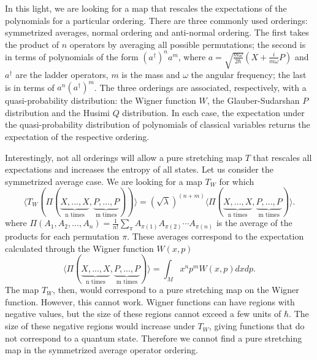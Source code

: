 \documentclass{article}
\begin{document}
In this light, we are looking for a map that rescales the expectations of the polynomials for a particular ordering. There are three commonly used orderings: symmetrized averages, normal ordering and anti-normal ordering. The first takes the product of $n$ operators by averaging all possible permutations; the second is in terms of polynomials of the form $(a^\dagger)^n a^m$, where $a=\sqrt{\frac{m\omega}{2\hbar}}(X+\frac{i}{m\omega}P)$ and $a^\dagger$ are the ladder operators, $m$ is the mass and $\omega$ the angular frequency; the last is in terms of $a^n (a^\dagger)^m$. The three orderings are associated, respectively, with a quasi-probability distribution:\cite{carmichael2013statistical} the Wigner function $W$, the Glauber-Sudarshan $P$ distribution and the Husimi $Q$ distribution. In each case, the expectation under the quasi-probability distribution of polynomials of classical variables returns the expectation of the respective ordering.

Interestingly, not all orderings will allow a pure stretching map $T$ that rescales all expectations and increases the entropy of all states. Let us consider the symmetrized average case. We are looking for a map $T_W$ for which
\begin{equation}
\langle T_W(\Pi(\underbrace{X, ..., X}_{\text{n times}}, \underbrace{P, ..., P}_{\text{m times}})) \rangle = (\sqrt{\lambda})^{(n+m)} \langle \Pi(\underbrace{X, ..., X}_{\text{n times}}, \underbrace{P, ..., P}_{\text{m times}})\rangle.
\end{equation}
where $\Pi(A_1, A_2, \ldots, A_n)  = \frac{1}{n!} \sum_{\pi}  A_{\pi(1)} A_{\pi(2)} \cdots A_{\pi(n)}$ is the average of the products for each permutation $\pi$. These averages correspond to the expectation calculated through the Wigner function $W(x,p)$
\begin{equation}
     \langle \Pi(\underbrace{X, ..., X}_{\text{n times}}, \underbrace{P, ..., P}_{\text{m times}})\rangle = \int_M x^n p^m W(x, p) dx dp.
\end{equation}
The map $T_W$, then, would correspond to a pure stretching map on the Wigner function. However, this cannot work. Wigner functions can have regions with negative values, but the size of these regions cannot exceed a few units of $\hbar$.\cite{kenfack2004negativity} The size of these negative regions would increase under $T_W$, giving functions that do not correspond to a quantum state. Therefore we cannot find a pure stretching map in the symmetrized average operator ordering.
\end{document}
